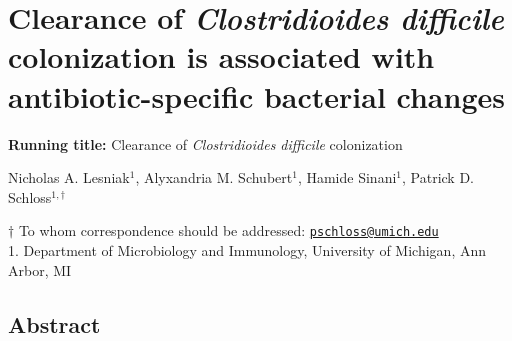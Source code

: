 \documentclass[12pt,]{article}
\title{}
\author{}
\date{}
\begin{document}
\linenumbers
\doublespacing

\hypertarget{clearance-of-clostridioides-difficile-colonization-is-associated-with-antibiotic-specific-bacterial-changes}{%
\section{\texorpdfstring{Clearance of \emph{Clostridioides difficile}
colonization is associated with antibiotic-specific bacterial
changes}{Clearance of Clostridioides difficile colonization is associated with antibiotic-specific bacterial changes}}\label{clearance-of-clostridioides-difficile-colonization-is-associated-with-antibiotic-specific-bacterial-changes}}

\vspace{30mm}

\textbf{Running title:} Clearance of \emph{Clostridioides difficile}
colonization

\vspace{20mm}

Nicholas A. Lesniak\(^1\), Alyxandria M. Schubert\(^1\), Hamide
Sinani\(^1\), Patrick D. Schloss\(^{1,\dagger}\)

\vspace{30mm}

\(\dagger\) To whom correspondence should be addressed:
\href{mailto:pschloss@umich.edu}{\nolinkurl{pschloss@umich.edu}}\\
1. Department of Microbiology and Immunology, University of Michigan,
Ann Arbor, MI

\newpage

\hypertarget{abstract}{%
\subsection{Abstract}\label{abstract}}
\end{document}
